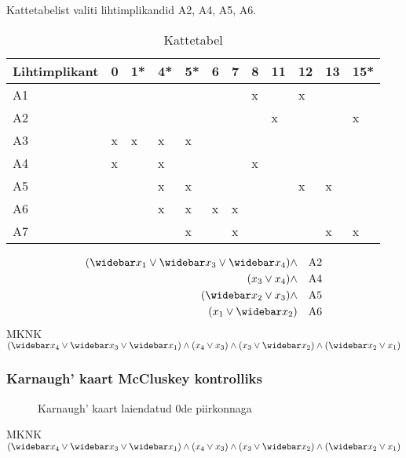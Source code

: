 Kattetabelist valiti lihtimplikandid A2, A4, A5, A6.
\begin{table}[H]
\centering
\caption{Kattetabel}
\label{kattetabel}
\begin{tabular}{|l|l|l|l|l|l|l|l|l|l|l|l|}
\hline
Lihtimplikant & 0 & 1* & 4* & 5* & 6 & 7 & 8 & 11 & 12 & 13 & 15* \\ \hline
A1            &   &    &    &    &   &   & x &    & x  &    &     \\ \hline
\rowcolor{LightCyan}
A2            &   &    &    &    &   &   &   & x  &    &    & x   \\ \hline
A3            & x & x  & x  & x  &   &   &   &    &    &    &     \\ \hline
\rowcolor{LightCyan}
A4            & x &    & x  &    &   &   & x &    &    &    &     \\ \hline
\rowcolor{LightCyan}
A5            &   &    & x  & x  &   &   &   &    & x  & x  &     \\ \hline
\rowcolor{LightCyan}
A6            &   &    & x  & x  & x & x &   &    &    &    &     \\ \hline
A7            &   &    &    & x  &   & x &   &    &    & x  & x   \\ \hline
\end{tabular}
\end{table}
\begin{align*} 
(\wb{x_1}\lor\wb{x_3}\lor\wb{x_4})\land &&\mbox{A2}\\
(x_3\lor x_4)\land &&\mbox{A4}\\
(\wb{x_2} \lor x_3)\land &&\mbox{A5}\\
(x_1\lor \wb{x_2}) &&\mbox{A6}
\end{align*}
MKNK $(\wb{x_4} \lor \wb{x_3} \lor \wb{x_1}) \land (x_4 \lor x_3) \land (x_3 \lor \wb{x_2}) \land (\wb{x_2} \lor x_1)$

\subsubsection{Karnaugh' kaart McCluskey kontrolliks}
\begin{figure}[H]
\centering
\begin{Karnaugh}
\end{Karnaugh}
\caption{Karnaugh' kaart laiendatud 0de piirkonnaga}
\label{fig:karnaugh-piirkond0}
\end{figure}
MKNK $(\wb{x_4} \lor \wb{x_3} \lor \wb{x_1}) \land (x_4 \lor x_3) \land (x_3 \lor \wb{x_2}) \land (\wb{x_2} \lor x_1)$
